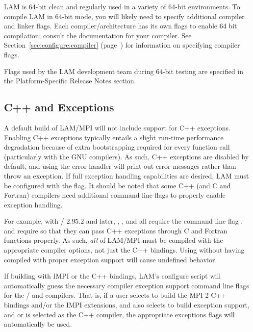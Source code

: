 LAM is 64-bit clean and regularly used in a variety of 64-bit
environments.  To compile LAM in 64-bit mode, you will likely need to
specify additional compiler and linker flags.  Each
compiler/architecture has its own flags to enable 64 bit compilation;
consult the documentation for your compiler.  See
Section~\ref{sec:configure:compiler}
(page~\pageref{sec:configure:compiler}) for information on specifying
compiler flags.

Flags used by the LAM development team during 64-bit testing are
specified in the Platform-Specific Release Notes section.



\subsection{C++ and Exceptions}
\label{sec:releasenotes:cxxexceptions}

A default build of LAM/MPI will not include support for C++
exceptions.  Enabling C++ exceptions typically entails a slight
run-time performance degradation because of extra bootstrapping
required for every function call (particularly with the GNU
compilers).  As such, C++ exceptions are disabled by default, and
using the  error handler
will print out error messages rather than throw an exception.  If full
exception handling capabilities are desired, LAM must be configured
with the  flag.  It should be noted that
some C++ (and C and Fortran) compilers need additional command line
flags to properly enable exception handling.

For example, with / 2.95.2 and later, ,
, and  all require the command line flag
.   and  require
 so that they can pass C++ exceptions through C
and Fortran functions properly.  As such, {\em all} of LAM/MPI must be
compiled with the appropriate compiler options, not just the C++
bindings. Using  without
having compiled with proper exception support will cause undefined
behavior.

If building with IMPI or the C++ bindings, LAM's configure script will
automatically guess the necessary compiler exception support command
line flags for the / and  compilers.  That
is, if a user selects to build the MPI 2 C++ bindings and/or the IMPI
extensions, and also selects to build exception support, and 
or  is selected as the C++ compiler, the appropriate
exceptions flags will automatically be used.

